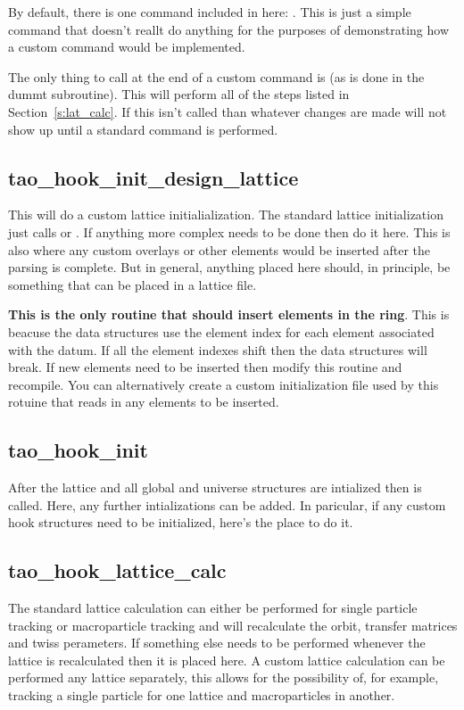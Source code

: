 By default, there is one command included in here: . This is just a
simple command that doesn't reallt do anything for the purposes of demonstrating
how a custom command would be implemented.

The only thing to call at the end of a custom command is
 (as is done in the dummt subroutine). This will perform
all of the steps listed in Section~\ref{s:lat_calc}. If this isn't called than
whatever changes are made will not show up until a standard command is
performed.

\subsection{tao\_hook\_init\_design\_lattice}

This will do a custom lattice initialialization. The standard lattice
initialization just calls  or . If anything more
complex needs to be done then do it here. This is also where any custom overlays
or other elements would be inserted after the parsing is complete. But in
general, anything placed here should, in principle, be something that can be
placed in a lattice file. 

\textbf{This is the only routine that should insert elements in the ring}. This is
beacuse the \tao data structures use the element index for each element
associated with the datum. If all the element indexes shift then the data
structures will break. If new elements need to be inserted then modify this
routine and recompile. You can alternatively create a custom initialization file
used by this rotuine
that reads in any elements to be inserted.

\subsection{tao\_hook\_init}

After the lattice and all global and universe structures are intialized then
 is called. Here, any further intializations can be added. In
paricular, if any custom hook structures need to be initialized, here's the
place to do it.

\subsection{tao\_hook\_lattice\_calc}

The standard lattice calculation can either be performed for single particle
tracking or macroparticle tracking and will recalculate the orbit, transfer
matrices and twiss perameters. If something else needs to be performed whenever
the lattice is recalculated then it is placed here. A custom lattice calculation
can be performed any lattice separately, this allows for the possibility of, for
example, 
tracking a single particle for one lattice and macroparticles in another.

